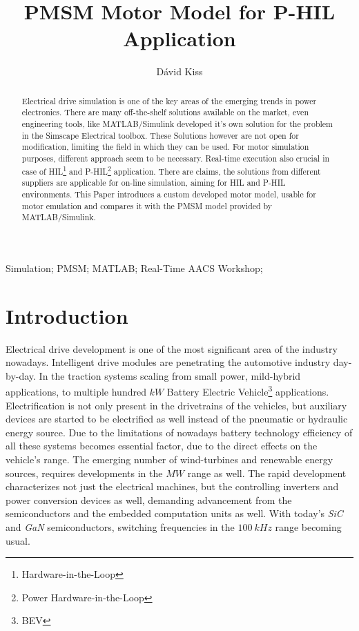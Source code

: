\documentclass[twoside,b5paper,10pt]{article}
\title{PMSM Motor Model for P-HIL Application}
\author{Dávid Kiss}
\begin{document}
\makeAutStyleTitle

\begin{abstract}
Electrical drive simulation is one of the key areas of the emerging trends in power electronics. There are many off-the-shelf solutions available on the market, even engineering tools, like MATLAB/Simulink developed it's own solution for the problem in the Simscape Electrical toolbox. These Solutions however are not open for modification, limiting the field in which they can be used. For motor simulation purposes, different approach seem to be necessary. Real-time execution also crucial in case of HIL\footnote{Hardware-in-the-Loop} and P-HIL\footnote{Power Hardware-in-the-Loop} application.
There are claims, the solutions from different suppliers are applicable for on-line simulation, aiming for HIL and P-HIL environments. This Paper introduces a custom developed motor model, usable for motor emulation and compares it with the PMSM model provided by MATLAB/Simulink.
\end{abstract}


\begin{keywords}
Simulation; PMSM; MATLAB; Real-Time AACS Workshop; 
\end{keywords}

\listoftodos

\section{Introduction}
\label{sec:Introdu}

Electrical drive development is one of the most significant area of the industry nowadays. Intelligent drive modules are penetrating the automotive industry day-by-day. In the traction systems scaling from small power, mild-hybrid applications, to multiple hundred $kW$ Battery Electric Vehicle\footnote{BEV} applications. Electrification is not only present in the drivetrains of the vehicles, but auxiliary devices are started to be electrified as well instead of the pneumatic or hydraulic energy source. Due to the limitations of nowadays battery technology efficiency of all these systems becomes essential factor, due to the direct effects on the vehicle's range.  The emerging number of wind-turbines and renewable energy sources, requires developments in the $MW$ range as well. The rapid development characterizes not just the electrical machines, but the controlling inverters and power conversion devices as well, demanding advancement from the semiconductors and the embedded computation units as well. With today's \emph{SiC} and \emph{GaN} semiconductors, switching frequencies in the $100\ kHz$ range becoming usual.
\end{document}
